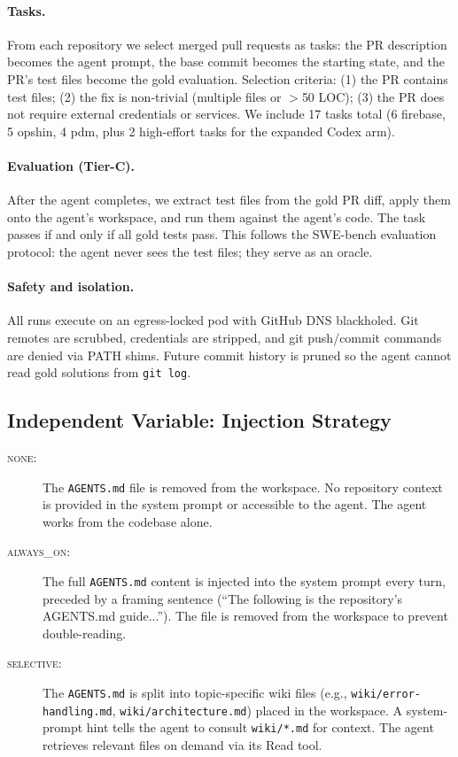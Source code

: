 \documentclass[11pt]{article}
\newcommand{\agentsmd}{\texttt{AGENTS.md}}
\newcommand{\none}{\textsc{none}}
\newcommand{\alwayson}{\textsc{always\_on}}
\newcommand{\selective}{\textsc{selective}}
\begin{document}
\paragraph{Tasks.}
From each repository we select merged pull requests as tasks: the PR description becomes the agent prompt, the base commit becomes the starting state, and the PR's test files become the gold evaluation.
Selection criteria: (1) the PR contains test files; (2) the fix is non-trivial (multiple files or $>$50 LOC); (3) the PR does not require external credentials or services.
We include 17 tasks total (6 firebase, 5 opshin, 4 pdm, plus 2 high-effort tasks for the expanded Codex arm).

\paragraph{Evaluation (Tier-C).}
After the agent completes, we extract test files from the gold PR diff, apply them onto the agent's workspace, and run them against the agent's code.
The task passes if and only if all gold tests pass.
This follows the SWE-bench evaluation protocol: the agent never sees the test files; they serve as an oracle.

\paragraph{Safety and isolation.}
All runs execute on an egress-locked pod with GitHub DNS blackholed.
Git remotes are scrubbed, credentials are stripped, and git push/commit commands are denied via PATH shims.
Future commit history is pruned so the agent cannot read gold solutions from \texttt{git log}.

\subsection{Independent Variable: Injection Strategy}
\label{sec:iv}

\begin{description}
    \item[\none:] The \agentsmd{} file is removed from the workspace. No repository context is provided in the system prompt or accessible to the agent. The agent works from the codebase alone.
    \item[\alwayson:] The full \agentsmd{} content is injected into the system prompt every turn, preceded by a framing sentence (``The following is the repository's AGENTS.md guide...'').  The file is removed from the workspace to prevent double-reading.
    \item[\selective:] The \agentsmd{} is split into topic-specific wiki files (e.g., \texttt{wiki/error-handling.md}, \texttt{wiki/architecture.md}) placed in the workspace. A system-prompt hint tells the agent to consult \texttt{wiki/*.md} for context. The agent retrieves relevant files on demand via its Read tool.
\end{description}
\end{document}
